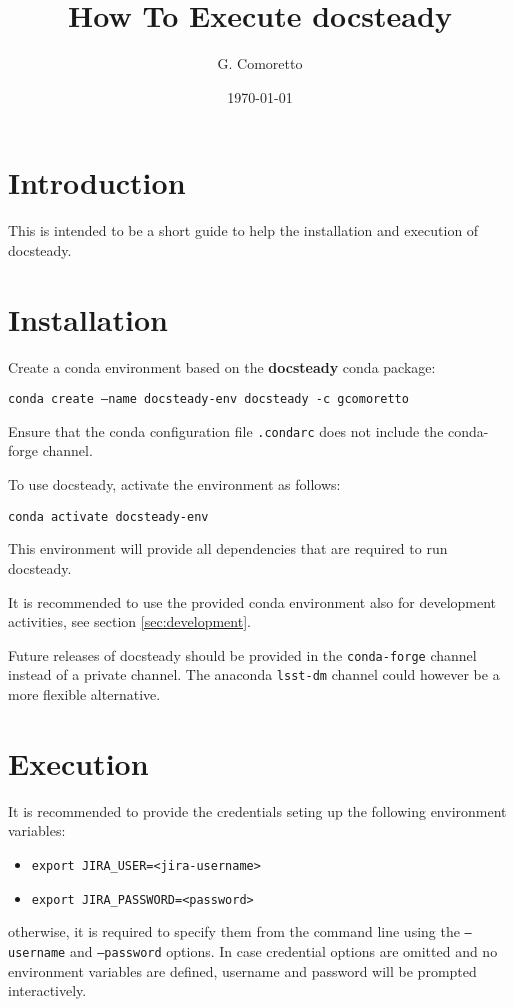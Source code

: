 \documentclass[DM]{lsstdoc}
\author{G. Comoretto}
\begin{document}
\date{\today}

\title{How To Execute docsteady}
\mkshorttitle

\section{Introduction}

This is intended to be a short guide to help the installation and  execution of docsteady.


\section{Installation}\label{sec:install}

Create a conda environment based on the \textbf{docsteady} conda package:

\texttt{conda create --name docsteady-env docsteady -c gcomoretto}

Ensure that the conda configuration file  \texttt{.condarc} does not include the conda-forge channel.

To use docsteady, activate the environment as follows:

\texttt{conda activate docsteady-env}

This environment will provide all dependencies that are required to run docsteady.

It is recommended to use the provided conda environment also for development activities, see section \ref{sec:development}.

Future releases of docsteady should be provided in the \texttt{conda-forge} channel instead of a private channel. 
The anaconda \texttt{lsst-dm} channel could however be a more flexible alternative.



\section{Execution}

It is recommended to provide the credentials seting up the following environment variables:

\begin{itemize}
\item \texttt{export JIRA\_USER=<jira-username>}
\item \texttt{export JIRA\_PASSWORD=<password>}
\end{itemize}

otherwise, it is required to specify them from the command line using the \texttt{--username} and \texttt{--password} options.
In case credential options are omitted and no environment variables are defined, username and password will be prompted interactively.
\end{document}
